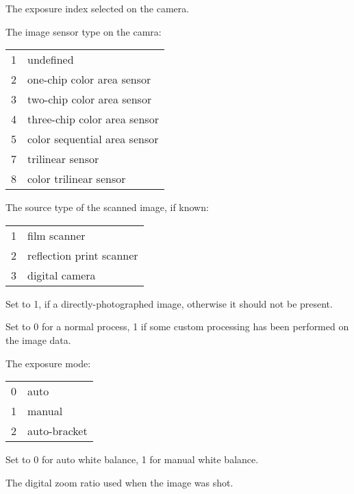
The exposure index selected on the camera.
\apiend

The image sensor type on the camra:
\smallskip

\begin{tabular}{p{0.3in} p{4in}}
1 & undefined \\
2 & one-chip color area sensor \\
3 & two-chip color area sensor \\
4 & three-chip color area sensor \\
5 & color sequential area sensor \\
7 & trilinear sensor \\
8 & color trilinear sensor 
\end{tabular}
\apiend

The source type of the scanned image, if known:
\smallskip

\begin{tabular}{p{0.3in} p{4in}}
1 & film scanner \\
2 & reflection print scanner \\
3 & digital camera \\
\end{tabular}
\apiend

Set to 1, if a directly-photographed image, otherwise it should not be
present.
\apiend


Set to 0 for a normal process, 1 if some custom processing has been
performed on the image data.
\apiend

The exposure mode:
\smallskip

\begin{tabular}{p{0.3in} p{4in}}
0 & auto \\
1 & manual \\
2 & auto-bracket
\end{tabular}
\apiend

Set to 0 for auto white balance, 1 for manual white balance.
\apiend

The digital zoom ratio used when the image was shot.
\apiend


